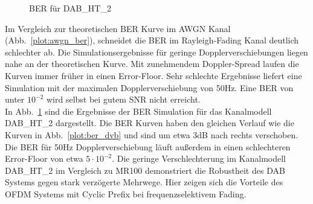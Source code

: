 \begin{figure}[htb]
\begin{minipage}[t]{0.48\textwidth}
        
        \caption{BER für DAB\_HT\_2}
        \label{plot:ber_dab_ht}
    \end{minipage}
\end{figure}


Im Vergleich zur theoretischen BER Kurve im AWGN Kanal (Abb.~\ref{plot:awgn_ber}), schneidet die BER im Rayleigh-Fading Kanal deutlich schlechter ab. Die Simulationsergebnisse für geringe Dopplerverschiebungen liegen nahe an der theoretischen Kurve. Mit zunehmendem Doppler-Spread laufen die Kurven immer früher in einen Error-Floor. Sehr schlechte Ergebnisse liefert eine Simulation mit der maximalen Dopplerverschiebung von 50Hz. Eine BER von unter $10^{-2}$ wird selbst bei gutem SNR nicht erreicht.
\\
In Abb.~\ref{plot:ber_dab_ht} sind die Ergebnisse der BER Simulation für das Kanalmodell DAB\_HT\_2 dargestellt. Die BER Kurven haben den gleichen Verlauf wie die Kurven in Abb.~\ref{plot:ber_dvb} und sind um etwa 3dB nach rechts verschoben. Die BER für 50Hz Dopplerverschiebung läuft außerdem in einen schlechteren Error-Floor von etwa $5\cdot 10^{-2}$. Die geringe Verschlechterung im Kanalmodell DAB\_HT\_2 im Vergleich zu MR100 demonstriert die Robustheit des DAB Systems gegen stark verzögerte Mehrwege. Hier zeigen sich die Vorteile des OFDM Systems mit Cyclic Prefix bei frequenzselektivem Fading.\\

